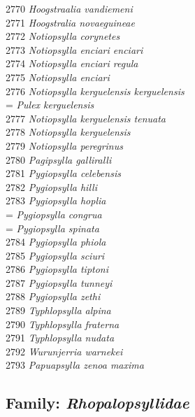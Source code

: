 \documentclass[
]{article}
\begin{document}
2770 \emph{Hoogstraalia vandiemeni}\\
2771 \emph{Hoogstralia novaeguineae}\\
2772 \emph{Notiopsylla corynetes}\\
2773 \emph{Notiopsylla enciari enciari}\\
2774 \emph{Notiopsylla enciari regula}\\
2775 \emph{Notiopsylla enciari}\\
2776 \emph{Notiopsylla kerguelensis kerguelensis}\\
= \emph{Pulex kerguelensis}\\
2777 \emph{Notiopsylla kerguelensis tenuata}\\
2778 \emph{Notiopsylla kerguelensis}\\
2779 \emph{Notiopsylla peregrinus}\\
2780 \emph{Pagipsylla galliralli}\\
2781 \emph{Pygiopsylla celebensis}\\
2782 \emph{Pygiopsylla hilli}\\
2783 \emph{Pygiopsylla hoplia}\\
= \emph{Pygiopsylla congrua}\\
= \emph{Pygiopsylla spinata}\\
2784 \emph{Pygiopsylla phiola}\\
2785 \emph{Pygiopsylla sciuri}\\
2786 \emph{Pygiopsylla tiptoni}\\
2787 \emph{Pygiopsylla tunneyi}\\
2788 \emph{Pygiopsylla zethi}\\
2789 \emph{Typhlopsylla alpina}\\
2790 \emph{Typhlopsylla fraterna}\\
2791 \emph{Typhlopsylla nudata}\\
2792 \emph{Wurunjerria warnekei}\\
2793 \emph{Papuapsylla zenoa maxima}

\hypertarget{family-rhopalopsyllidae}{%
\subsection{\texorpdfstring{Family:
\emph{Rhopalopsyllidae}}{Family: Rhopalopsyllidae}}\label{family-rhopalopsyllidae}}
\end{document}
